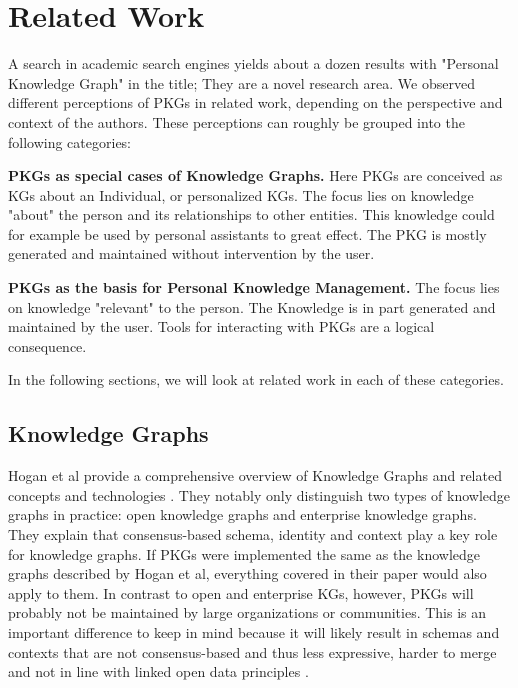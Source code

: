 \chapter{Related Work} \label{ch:relatedwork}

A search in academic search engines yields about a dozen results with "Personal Knowledge Graph" in the title; They are a novel research area. We observed different perceptions of PKGs in related work, depending on the perspective and context of the authors. These perceptions can roughly be grouped into the following categories:

\textbf{PKGs as special cases of Knowledge Graphs.} Here PKGs are conceived as KGs about an Individual, or personalized KGs. The focus lies on knowledge "about" the person and its relationships to other entities. This knowledge could for example be used by personal assistants to great effect. The PKG is mostly generated and maintained without intervention by the user.

\textbf{PKGs as the basis for Personal Knowledge Management.} The focus lies on knowledge "relevant" to the person. The Knowledge is in part generated and maintained by the user. Tools for interacting with PKGs are a logical consequence.

In the following sections, we will look at related work in each of these categories.

\section{Knowledge Graphs}

Hogan et al provide a comprehensive overview of Knowledge Graphs and related concepts and technologies \cite{Hogan2021KG}. They notably only distinguish two types of knowledge graphs in practice: open knowledge graphs and enterprise knowledge graphs. They explain that consensus-based schema, identity and context play a key role for knowledge graphs. If PKGs were implemented the same as the knowledge graphs described by Hogan et al, everything covered in their paper would also apply to them. In contrast to open and enterprise KGs, however, PKGs will probably not be maintained by large organizations or communities. This is an important difference to keep in mind because it will likely result in schemas and contexts that are not consensus-based and thus less expressive, harder to merge and not in line with linked open data principles \cite{lod}.

